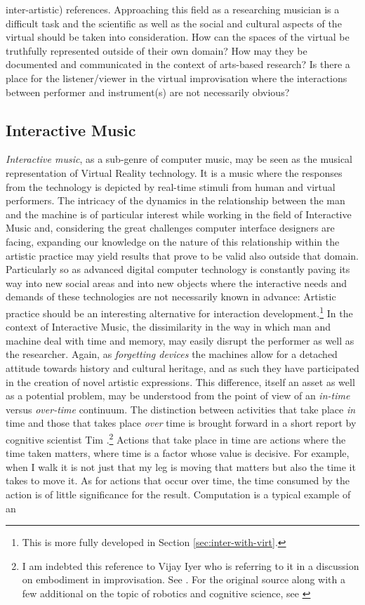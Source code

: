 inter-artistic) references. Approaching this field as a researching musician is a difficult task and the scientific as well as the social and cultural aspects of the virtual should be taken into consideration. How can the spaces of the virtual be truthfully represented outside of their own domain? How may they be documented and communicated in the context of arts-based research? Is there a place for the listener/viewer in the virtual improvisation where the interactions between performer and instrument(s) are not necessarily obvious?

\subsection*{Interactive Music}
\label{sec:interactive-music}


\emph{Interactive music}, as a sub-genre of computer music, may be seen as the musical representation of Virtual Reality technology. It is a music where the responses from the technology is depicted by real-time stimuli from human and virtual performers. The intricacy of the dynamics in the relationship between the man and the machine is of particular interest while working in the field of Interactive Music and, considering the great challenges computer interface designers are facing, expanding our knowledge on the nature of this relationship within the artistic practice may yield results that prove to be valid also outside that domain. Particularly so as advanced digital computer technology is constantly paving its way into new social areas and into new objects where the interactive needs and demands of these technologies are not necessarily known in advance: Artistic practice should be an interesting alternative for interaction development.\footnote{This is more fully developed in Section \ref{sec:inter-with-virt}.} In the context of Interactive Music, the dissimilarity in the way in which man and machine deal with time and memory, may easily disrupt the performer as well as the researcher. Again, as \emph{forgetting devices} the machines allow for a detached attitude towards history and cultural heritage, and as such they have participated in the creation of novel artistic expressions. This difference, itself an asset as well as a potential problem, may be understood from the point of view of an \emph{in-time} versus \emph{over-time} continuum. The distinction between activities that take place \emph{in} time and those that takes place \emph{over} time is brought forward in a short report by cognitive scientist Tim \citeauthor{smithers96}.\footnote{I am indebted this reference to Vijay Iyer who is referring to it in a discussion on embodiment in improvisation. See \parencite{iyer08}. For the original source along with a few additional on the topic of robotics and cognitive science, see \parencite[][]{smithers96,vangelder98,smithers:98}} Actions that take place in time are actions where the time taken matters, where time is a factor whose value is decisive. For example, when I walk it is not just that my leg is moving that matters but also the time it takes to move it. As for actions that occur over time, the time consumed by the action is of little significance for the result. Computation is a typical example of an 